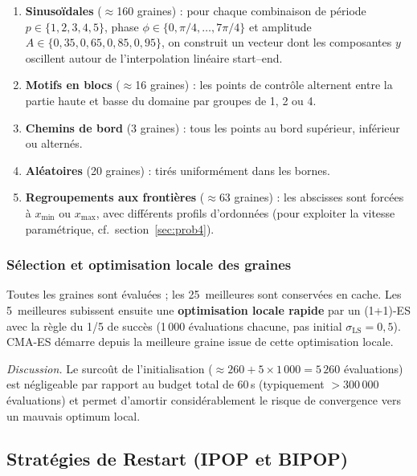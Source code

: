 \begin{enumerate}[nosep]
  \item \textbf{Sinusoïdales} ($\approx$160 graines) : pour chaque combinaison
        de période $p \in \{1,2,3,4,5\}$, phase $\phi \in \{0, \pi/4, \ldots,
        7\pi/4\}$ et amplitude $A \in \{0{,}35, 0{,}65, 0{,}85, 0{,}95\}$,
        on construit un vecteur dont les composantes $y$ oscillent autour de
        l'interpolation linéaire start--end.
  \item \textbf{Motifs en blocs} ($\approx$16 graines) : les points de contrôle
        alternent entre la partie haute et basse du domaine par groupes de 1, 2
        ou 4.
  \item \textbf{Chemins de bord} (3 graines) : tous les points au bord supérieur,
        inférieur ou alternés.
  \item \textbf{Aléatoires} (20 graines) : tirés uniformément dans les bornes.
  \item \textbf{Regroupements aux frontières} ($\approx$63 graines) : les
        abscisses sont forcées à $x_{\min}$ ou $x_{\max}$, avec différents
        profils d'ordonnées (pour exploiter la vitesse paramétrique, cf.\
        section~\ref{sec:prob4}).
\end{enumerate}

\subsubsection{Sélection et optimisation locale des graines}

Toutes les graines sont évaluées ; les 25~meilleures sont conservées en cache.
Les 5~meilleures subissent ensuite une \textbf{optimisation locale rapide} par
un (1+1)-ES avec la règle du 1/5 de succès (1\,000 évaluations chacune, pas
initial $\sigma_{\text{LS}} = 0{,}5$).  CMA-ES démarre depuis la meilleure
graine issue de cette optimisation locale.

\emph{Discussion.}  Le surcoût de l'initialisation
($\approx 260 + 5 \times 1\,000 = 5\,260$ évaluations) est négligeable
par rapport au budget total de 60\,s (typiquement $>$300\,000 évaluations) et
permet d'amortir considérablement le risque de convergence vers un mauvais
optimum local.

\subsection{Stratégies de Restart (IPOP et BIPOP)}
\label{sec:ipop-bipop}

